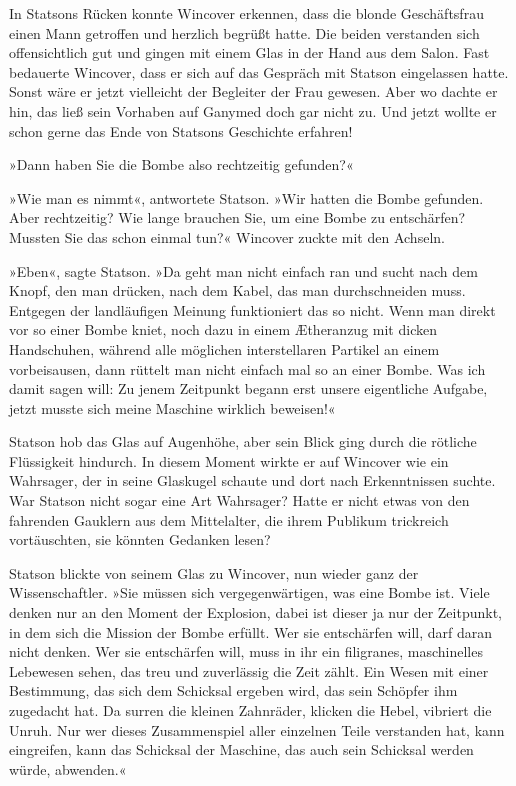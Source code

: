 \bigpar

In Statsons Rücken konnte Wincover erkennen, dass die blonde
Geschäftsfrau einen Mann getroffen und herzlich begrüßt hatte. Die
beiden verstanden sich offensichtlich gut und gingen mit einem Glas
in der Hand aus dem Salon. Fast bedauerte Wincover, dass er sich
auf das Gespräch mit Statson eingelassen hatte. Sonst wäre er jetzt
vielleicht der Begleiter der Frau gewesen. Aber wo dachte er hin,
das ließ sein Vorhaben auf Ganymed doch gar nicht zu. Und jetzt
wollte er schon gerne das Ende von Statsons Geschichte erfahren!

»Dann haben Sie die Bombe also rechtzeitig gefunden?«

»Wie man es nimmt«, antwortete Statson. »Wir hatten die Bombe
gefunden. Aber rechtzeitig? Wie lange brauchen Sie, um eine Bombe
zu entschärfen? Mussten Sie das schon einmal tun?« Wincover zuckte
mit den Achseln.

»Eben«, sagte Statson. »Da geht man nicht einfach ran und sucht
nach dem Knopf, den man drücken, nach dem Kabel, das man
durchschneiden muss. Entgegen der landläufigen Meinung funktioniert
das so nicht. Wenn man direkt vor so einer Bombe kniet, noch dazu
in einem Ætheranzug mit dicken Handschuhen, während alle möglichen
interstellaren Partikel an einem vorbeisausen, dann rüttelt man
nicht einfach mal so an einer Bombe. Was ich damit sagen will: Zu
jenem Zeitpunkt begann erst unsere eigentliche Aufgabe, jetzt
musste sich meine Maschine wirklich beweisen!«

Statson hob das Glas auf Augenhöhe, aber sein Blick ging durch die
rötliche Flüssigkeit hindurch. In diesem Moment wirkte er auf
Wincover wie ein Wahrsager, der in seine Glaskugel schaute und dort
nach Erkenntnissen suchte. War Statson nicht sogar eine Art
Wahrsager? Hatte er nicht etwas von den fahrenden Gauklern aus dem
Mittelalter, die ihrem Publikum trickreich vortäuschten, sie
könnten Gedanken lesen?

Statson blickte von seinem Glas zu Wincover, nun wieder ganz der
Wissenschaftler. »Sie müssen sich vergegenwärtigen, was eine Bombe
ist. Viele denken nur an den Moment der Explosion, dabei ist dieser
ja nur der Zeitpunkt, in dem sich die Mission der Bombe erfüllt.
Wer sie entschärfen will, darf daran nicht denken. Wer sie
entschärfen will, muss in ihr ein filigranes, maschinelles
Lebewesen sehen, das treu und zuverlässig die Zeit zählt. Ein Wesen
mit einer Bestimmung, das sich dem Schicksal ergeben wird, das sein
Schöpfer ihm zugedacht hat. Da surren die kleinen Zahnräder,
klicken die Hebel, vibriert die Unruh. Nur wer dieses Zusammenspiel
aller einzelnen Teile verstanden hat, kann eingreifen, kann das
Schicksal der Maschine, das auch sein Schicksal werden würde,
abwenden.«

